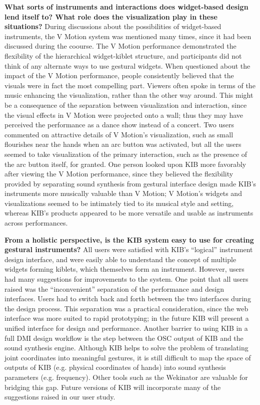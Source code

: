 \documentclass{nime-alternate}
\begin{document}
\textbf{What sorts of instruments and interactions does widget-based design lend itself to? What role does the visualization
play in these situations?}
During discussions about the possibilities of widget-based instruments, the V Motion system was mentioned many
times, since it had been discussed during the coourse. The V Motion performance demonstrated the flexibility
of the hierarchical widget-kiblet structure, and participants did not think of any alternate ways to use gestural widgets.
When questioned about the impact of the V Motion performance, people consistently believed that the visuals were in 
fact the most compelling part. Viewers often spoke in terms of the music enhancing the visualization, rather than the
other way around. This might
be a consequence of the separation between visualization and interaction, since the visual effects in V Motion were
projected onto a wall; thus they may have perceived the performance as a dance show instead of a concert.
Two users commented on attractive details of V Motion's visualization, such as small flourishes near
the hands when an arc button was activated, but all the users seemed to take visualization of the primary interaction, such
as the presence of the arc button itself, for granted. One person looked upon KIB more favorably after viewing the
V Motion performance, since they believed the flexibility provided by separating sound synthesis from gestural interface design
made KIB's instruments more musically valuable than V Motion; V Motion's widgets and visualizations seemed to be
intimately tied to its musical style and setting, whereas KIB's products appeared to be more versatile and usable
as instruments across performances.

\textbf{From a holistic perspective, is the KIB system easy to use for creating gestural instruments?}
All users were satisfied with KIB's ``logical'' instrument design interface, 
and were easily able to understand the concept of multiple widgets forming kiblets, which 
themselves form an instrument. However, users had many suggestions for improvements to the system.
One point that all users raised was the ``inconvenient'' separation of the performance and design interfaces. Users
had to switch back and forth between the two interfaces during the design process.
This separation was a practical consideration, since the web interface was more suited to rapid prototyping; in
the future KIB will present a unified interface for design and performance. 
Another barrier to using KIB in a full DMI design workflow is the step between the OSC output of KIB and the sound synthesis engine. Although
KIB helps to solve the problem of translating joint coordinates into meaningful gestures, it is still difficult to map the space
of outputs of KIB (e.g. physical coordinates of hands) into sound synthesis parameters (e.g. frequency). Other tools such as
the Wekinator \cite{fiebrink2009meta} are valuable for bridging this gap.
Future versions of KIB will incorporate many of the suggestions raised in our user study.
\end{document}
